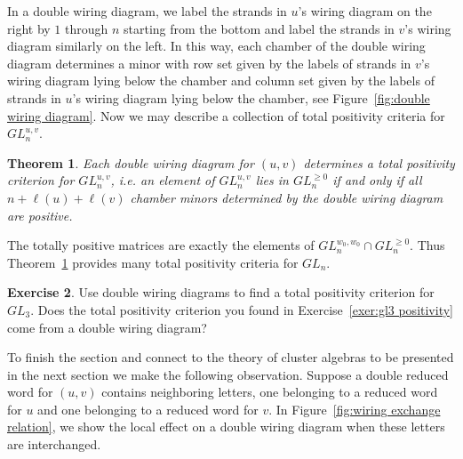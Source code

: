 \documentclass{amsart}
\newtheorem{theorem}{Theorem}[section]
\theoremstyle{definition}
\newtheorem{exercise}[theorem]{Exercise}
\theoremstyle{remark}
\numberwithin{equation}{section}
\begin{document}
    In a double wiring diagram, we label the strands in $u$'s wiring diagram on the right by $1$ through $n$ starting from the bottom and label the strands in $v$'s wiring diagram similarly on the left.  In this way, each chamber of the double wiring diagram determines a minor with row set given by the labels of strands in $v$'s wiring diagram lying below the chamber and column set given by the labels of strands in $u$'s wiring diagram lying below the chamber, see Figure~\ref{fig:double wiring diagram}.  Now we may describe a collection of total positivity criteria for $GL_n^{u,v}$.
    \setcounter{subtheorem}{3}
    \begin{theorem}\label{th:total positivity criteria}\cite{FZ99}
      Each double wiring diagram for $(u,v)$ determines a total positivity criterion for $GL_n^{u,v}$, i.e. an element of $GL_n^{u,v}$ lies in $GL_n^{\ge0}$ if and only if all $n+\ell(u)+\ell(v)$ chamber minors determined by the double wiring diagram are positive.
    \end{theorem}
    The totally positive matrices are exactly the elements of $GL_n^{w_0,w_0}\cap GL_n^{\ge0}$.  Thus Theorem~\ref{th:total positivity criteria} provides many total positivity criteria for $GL_n$.
    \setcounter{subexercise}{4}
    \begin{exercise}
      Use double wiring diagrams to find a total positivity criterion for $GL_3$.  Does the total positivity criterion you found in Exercise~\ref{exer:gl3 positivity} come from a double wiring diagram?
    \end{exercise}
    To finish the section and connect to the theory of cluster algebras to be presented in the next section we make the following observation.  Suppose a double reduced word for $(u,v)$ contains neighboring letters, one belonging to a reduced word for $u$ and one belonging to a reduced word for $v$.  In Figure~\ref{fig:wiring exchange relation}, we show the local effect on a double wiring diagram when these letters are interchanged. 
\end{document}
